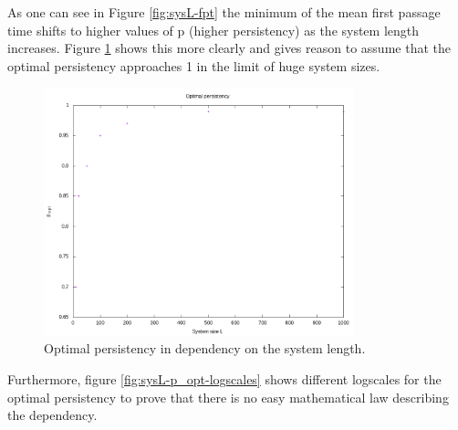 \documentclass[]{scrartcl}
\begin{document}
As one can see in Figure \ref{fig:sysL-fpt} the minimum of the mean first passage time shifts to higher values of p (higher persistency) as the system length increases. Figure \ref{fig:sysL-p_opt} shows this more clearly and gives reason to assume that the optimal persistency approaches 1 in the limit of huge system sizes.

\begin{figure}[!hbt]
 \centering
 \includegraphics[width=0.8\textwidth]{./fig/sysL/p_opt.png}
 \caption{Optimal persistency in dependency on the system length.}
 \label{fig:sysL-p_opt}
\end{figure}

Furthermore, figure \ref{fig:sysL-p_opt-logscales} shows different logscales for the optimal persistency to prove that there is no easy mathematical law describing the dependency.
 
\end{document}
